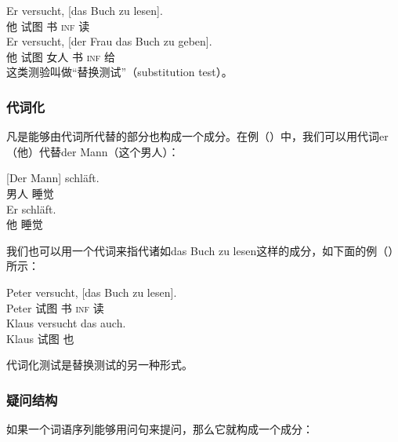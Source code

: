 \eal
\ex\label{ex-das-buch-zu-lesen} 
\gll Er versucht, [das Buch zu lesen].\\
	他 试图 \spacebr{} 书 \textsc{inf} 读\\
\ex 
\gll Er versucht, [der Frau das Buch zu geben].\\
	 他 试图 \spacebr{} 女人  书 \textsc{inf} 给\\
\zl
%
这类测验叫做“替换测试”（substitution test）。

\subsubsection{代词化}
凡是能够由代词所代替的部分也构成一个成分。在例（）中，我们可以用代词er（他）代替der Mann（这个男人）：

\eal
\ex 
\gll {}[Der Mann] schläft.\\
	 {}\spacebr{} 男人 睡觉\\
\ex 
\gll Er schläft.\\
	 他 睡觉\\
\zl

\noindent
我们也可以用一个代词来指代诸如das Buch zu lesen这样的成分，如下面的例（）所示：

\eal
\ex 
\gll Peter versucht, [das Buch zu lesen].\\
	 Peter  试图 \spacebr{} 书 \textsc{inf} 读\\
\ex 
\gll Klaus versucht das auch.\\
	 Klaus 试图  也\\
\zl

\noindent
代词化测试是替换测试的另一种形式。

\subsubsection{疑问结构}
如果一个词语序列能够用问句来提问，那么它就构成一个成分：

